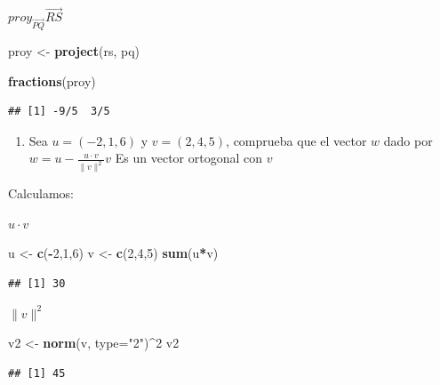 \documentclass[]{article}
\newenvironment{Shaded}{\begin{snugshade}}{\end{snugshade}}
\newcommand{\DataTypeTok}[1]{\textcolor[rgb]{0.13,0.29,0.53}{#1}}
\newcommand{\DecValTok}[1]{\textcolor[rgb]{0.00,0.00,0.81}{#1}}
\newcommand{\KeywordTok}[1]{\textcolor[rgb]{0.13,0.29,0.53}{\textbf{#1}}}
\newcommand{\NormalTok}[1]{#1}
\newcommand{\OperatorTok}[1]{\textcolor[rgb]{0.81,0.36,0.00}{\textbf{#1}}}
\newcommand{\StringTok}[1]{\textcolor[rgb]{0.31,0.60,0.02}{#1}}
\providecommand{\tightlist}{%
  \setlength{\itemsep}{0pt}\setlength{\parskip}{0pt}}
\begin{document}
\(proy_{\vec{PQ}}\vec{RS}\)

\begin{Shaded}
\begin{Highlighting}[]
\NormalTok{proy <-}\StringTok{ }\KeywordTok{project}\NormalTok{(rs, pq)}

\KeywordTok{fractions}\NormalTok{(proy)}
\end{Highlighting}
\end{Shaded}

\begin{verbatim}
## [1] -9/5  3/5
\end{verbatim}

\begin{enumerate}
\def\labelenumi{\arabic{enumi}.}
\setcounter{enumi}{1}
\tightlist
\item
  Sea \(u = (-2,1,6)\) y \(v = (2,4,5)\), comprueba que el vector \(w\)
  dado por \(w = u - \frac{u \cdot v}{\|v\|^2} v\) Es un vector
  ortogonal con \(v\)
\end{enumerate}

Calculamos:

\(u \cdot v\)

\begin{Shaded}
\begin{Highlighting}[]
\NormalTok{u <-}\StringTok{ }\KeywordTok{c}\NormalTok{(}\OperatorTok{-}\DecValTok{2}\NormalTok{,}\DecValTok{1}\NormalTok{,}\DecValTok{6}\NormalTok{)}
\NormalTok{v <-}\StringTok{ }\KeywordTok{c}\NormalTok{(}\DecValTok{2}\NormalTok{,}\DecValTok{4}\NormalTok{,}\DecValTok{5}\NormalTok{)}
\KeywordTok{sum}\NormalTok{(u}\OperatorTok{*}\NormalTok{v)}
\end{Highlighting}
\end{Shaded}

\begin{verbatim}
## [1] 30
\end{verbatim}

\({\|v\|^2}\)

\begin{Shaded}
\begin{Highlighting}[]
\NormalTok{v2 <-}\StringTok{ }\KeywordTok{norm}\NormalTok{(v, }\DataTypeTok{type=}\StringTok{"2"}\NormalTok{)}\OperatorTok{^}\DecValTok{2}
\NormalTok{v2}
\end{Highlighting}
\end{Shaded}

\begin{verbatim}
## [1] 45
\end{verbatim}
\end{document}
